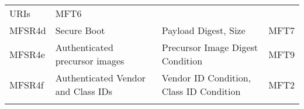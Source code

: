 \documentclass[0-thesis.tex]{subfiles}
\begin{document}
\begin{longtable}[]{@{}llll@{}}
\begin{minipage}[t]{0.34\columnwidth}
    URIs\strut
    \end{minipage} & \begin{minipage}[t]{0.10\columnwidth}\raggedright\strut
    MFT6\strut
    \end{minipage}\tabularnewline
    \begin{minipage}[t]{0.16\columnwidth}\raggedright\strut
    MFSR4d\strut
    \end{minipage} & \begin{minipage}[t]{0.29\columnwidth}\raggedright\strut
    Secure Boot\strut
    \end{minipage} & \begin{minipage}[t]{0.34\columnwidth}\raggedright\strut
    Payload Digest, Size\strut
    \end{minipage} & \begin{minipage}[t]{0.10\columnwidth}\raggedright\strut
    MFT7\strut
    \end{minipage}\tabularnewline
    \begin{minipage}[t]{0.16\columnwidth}\raggedright\strut
    MFSR4e\strut
    \end{minipage} & \begin{minipage}[t]{0.29\columnwidth}\raggedright\strut
    Authenticated precursor images\strut
    \end{minipage} & \begin{minipage}[t]{0.34\columnwidth}\raggedright\strut
    Precursor Image Digest Condition\strut
    \end{minipage} & \begin{minipage}[t]{0.10\columnwidth}\raggedright\strut
    MFT9\strut
    \end{minipage}\tabularnewline
    \begin{minipage}[t]{0.16\columnwidth}\raggedright\strut
    MFSR4f\strut
    \end{minipage} & \begin{minipage}[t]{0.29\columnwidth}\raggedright\strut
    Authenticated Vendor and Class IDs\strut
    \end{minipage} & \begin{minipage}[t]{0.34\columnwidth}\raggedright\strut
    Vendor ID Condition, Class ID Condition\strut
    \end{minipage} & \begin{minipage}[t]{0.10\columnwidth}\raggedright\strut
    MFT2\strut
    \end{minipage}\tabularnewline
    \begin{minipage}[t]{0.16\columnwidth}\raggedright\strut

\end{minipage}
\end{longtable}
\end{document}
